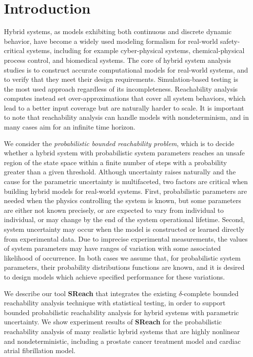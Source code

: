 \section{Introduction}  
Hybrid systems, as models exhibiting both continuous and discrete dynamic behavior, have become 
a widely used modeling formalism for real-world safety-critical systems,
including for example cyber-physical systems, chemical-physical process control, and biomedical systems. 
The core of hybrid system analysis studies is to construct accurate computational models for real-world systems, 
and to verify that they meet their design requirements. Simulation-based testing 
is the most used approach regardless of its incompleteness. Reachability analysis computes instead set over-approximations that
cover all system behaviors, which lead to a better input coverage but are naturally harder to scale.
It is important to note that reachability analysis can handle models with nondeterminism, and in many cases aim for an infinite time horizon.

We consider the {\em probabilistic bounded reachability problem}, which is to decide whether
a hybrid system with probabilistic system parameters reaches an unsafe region of the
state space within a finite number of steps with a probability greater than a given threshold.
Although uncertainty raises naturally and the cause for the parametric uncertainty is multifaceted, two factors 
are critical when building hybrid models for real-world systems. 
First, probabilistic parameters are needed when the physics controlling the system is known, but some 
parameters are either not known precisely, or are expected to vary from individual to individual, 
or may change by the end of the system operational lifetime. 
Second, system uncertainty may occur when the model is constructed or learned directly from experimental data. 
Due to imprecise experimental measurements, the values of system parameters may have ranges of variation 
with some associated likelihood of occurrence. 
In both cases we assume that, for probabilistic system parameters, their probability distributions functions 
are known, and it is desired to design models which achieve specified performance for these variations.   

We describe our tool {\bf SReach} that integrates the existing $\delta$-complete bounded 
reachability analysis technique \cite{gaodelta} with statistical testing, in order
to support bounded probabilistic reachability analysis for hybrid systems with parametric uncertainty. 
We show experiment results of {\bf SReach} for the probabilistic reachability analysis of many realistic hybrid systems that are highly nonlinear and nondeterministic, including a prostate cancer treatment model and cardiac atrial fibrillation model. 

